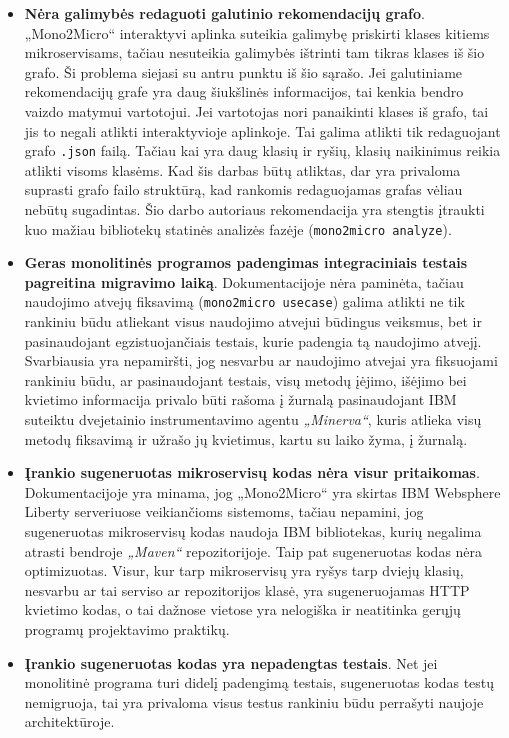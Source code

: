 \documentclass{VUMIFPSbakalaurinis}
\begin{document}
\begin{itemize}
    \item \textbf{Nėra galimybės redaguoti galutinio rekomendacijų grafo}. „Mono2Micro“ interaktyvi aplinka suteikia galimybę priskirti klases kitiems mikroservisams, tačiau nesuteikia galimybės ištrinti tam tikras klases iš šio grafo. Ši problema siejasi su antru punktu iš šio sąrašo. Jei galutiniame rekomendacijų grafe yra daug šiukšlinės informacijos, tai kenkia bendro vaizdo matymui vartotojui. Jei vartotojas nori panaikinti klases iš grafo, tai jis to negali atlikti interaktyvioje aplinkoje. Tai galima atlikti tik redaguojant grafo \verb|.json| failą. Tačiau kai yra daug klasių ir ryšių, klasių naikinimus reikia atlikti visoms klasėms. Kad šis darbas būtų atliktas, dar yra privaloma suprasti grafo failo struktūrą, kad rankomis redaguojamas grafas vėliau nebūtų sugadintas. Šio darbo autoriaus rekomendacija yra stengtis įtraukti kuo mažiau bibliotekų statinės analizės fazėje (\verb|mono2micro analyze|).

    \item \textbf{Geras monolitinės programos padengimas integraciniais testais pagreitina migravimo laiką}. Dokumentacijoje nėra paminėta, tačiau naudojimo atvejų fiksavimą (\verb|mono2micro usecase|) galima atlikti ne tik rankiniu būdu atliekant visus naudojimo atvejui būdingus veiksmus, bet ir pasinaudojant egzistuojančiais testais, kurie padengia tą naudojimo atvejį. Svarbiausia yra nepamiršti, jog nesvarbu ar naudojimo atvejai yra fiksuojami rankiniu būdu, ar pasinaudojant testais, visų metodų įėjimo, išėjimo bei kvietimo informacija privalo būti rašoma į žurnalą pasinaudojant IBM suteiktu dvejetainio instrumentavimo agentu \emph{„Minerva“}, kuris atlieka visų metodų fiksavimą ir užrašo jų kvietimus, kartu su laiko žyma, į žurnalą.

    \item \textbf{Įrankio sugeneruotas mikroservisų kodas nėra visur pritaikomas}. Dokumentacijoje yra minama, jog „Mono2Micro“ yra skirtas IBM Websphere Liberty serveriuose veikiančioms sistemoms, tačiau nepamini, jog sugeneruotas mikroservisų kodas naudoja IBM bibliotekas, kurių negalima atrasti bendroje \emph{„Maven“} repozitorijoje. Taip pat sugeneruotas kodas nėra optimizuotas. Visur, kur tarp mikroservisų yra ryšys tarp dviejų klasių, nesvarbu ar tai serviso ar repozitorijos klasė, yra sugeneruojamas HTTP kvietimo kodas, o tai dažnose vietose yra nelogiška ir neatitinka gerųjų programų projektavimo praktikų.

    \item \textbf{Įrankio sugeneruotas kodas yra nepadengtas testais}. Net jei monolitinė programa turi didelį padengimą testais, sugeneruotas kodas testų nemigruoja, tai yra privaloma visus testus rankiniu būdu perrašyti naujoje architektūroje.
\end{itemize}
\end{document}
